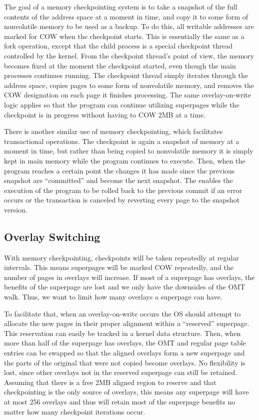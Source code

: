 The goal of a memory checkpointing system is to take a snapshot of the full contents of the address space at a moment in time, and copy it to some form of nonvolatile memory to be used as a backup. To do this, all writable addresses are marked for COW when the checkpoint starts. This is essentially the same as a fork operation, except that the child process is a special checkpoint thread controlled by the kernel. From the checkpoint thread's point of view, the memory becomes fixed at the moment the checkpoint started, even though the main processes continues running. The checkpoint thread simply iterates through the address space, copies pages to some form of nonvolatile memory, and removes the COW designation on each page it finishes processing. The same overlay-on-write logic applies so that the program can continue utilizing superpages while the checkpoint is in progress without having to COW 2MB at a time.

There is another similar use of memory checkpointing, which facilitates transactional operations. The checkpoint is again a snapshot of memory at a moment in time, but rather than being copied to nonvolatile memory it is simply kept in main memory while the program continues to execute. Then, when the program reaches a certain point the changes it has made since the previous snapshot are ``committed'' and become the next snapshot. The enables the execution of the program to be rolled back to the previous commit if an error occurs or the transaction is canceled by reverting every page to the snapshot version.

\subsection{Overlay Switching}
With memory checkpointing, checkpoints will be taken repeatedly at regular intervals. This means superpages will be marked COW repeatedly, and the number of pages in overlays will increase. If most of a superpage has overlays, the benefits of the superpage are lost and we only have the downsides of the OMT walk. Thus, we want to limit how many overlays a superpage can have.

To facilitate that, when an overlay-on-write occurs the OS should attempt to allocate the new pages in their proper alignment within a ``reserved'' superpage. This reservation can easily be tracked in a kernel data structure. Then, when more than half of the superpage has overlays, the OMT and regular page table entries can be swapped so that the aligned overlays form a new superpage and the parts of the original that were not copied become overlays. No flexibility is lost, since other overlays not in the reserved superpage can still be retained. Assuming that there is a free 2MB aligned region to reserve and that checkpointing is the only source of overlays, this means any superpage will have at most 256 overlays and thus will retain most of the superpage benefits no matter how many checkpoint iterations occur.

